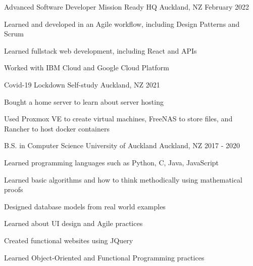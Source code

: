 

\begin{cventries}

  \cventry
    {Advanced Software Developer}
    {Mission Ready HQ}
    {Auckland, NZ}
    {February 2022}
    {
      \begin{cvitems}
        \item {Learned and developed in an Agile workflow, including Design Patterns and Scrum}
        \item {Learned fullstack web development, including React and APIs}
        \item {Worked with IBM Cloud and Google Cloud Platform}
      \end{cvitems}
    }

  \cventry
    {Covid-19 Lockdown}
    {Self-study}
    {Auckland, NZ}
    {2021}
    {
      \begin{cvitems}
        \item {Bought a home server to learn about server hosting}
        \item {Used Proxmox VE to create virtual machines, FreeNAS to store files, and Rancher to host docker containers}
      \end{cvitems}
    }

  \cventry
    {B.S. in Computer Science} %
    {University of Auckland} %
    {Auckland, NZ} %
    {2017 - 2020} %
    {
      \begin{cvitems} %
        \item {Learned programming languages such as Python, C, Java, JavaScript}
        \item {Learned basic algorithms and how to think methodically using mathematical proofs}
        \item {Designed database models from real world examples}
        \item {Learned about UI design and Agile practices}
        \item {Created functional websites using JQuery}
        \item {Learned Object-Oriented and Functional Programming practices}
      \end{cvitems}
    }

\end{cventries}
